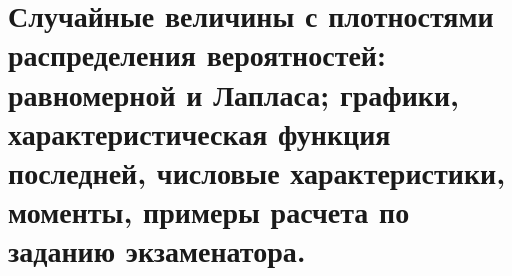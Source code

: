 \documentclass[polytech/stats/exam-2023/stats-exam-2023.tex]{subfiles}
\begin{document}
\section{Случайные величины с плотностями распределения вероятностей: равномерной и Лапласа; графики, характеристическая функция последней, числовые характеристики, моменты, примеры расчета по заданию экзаменатора.}
\end{document}
